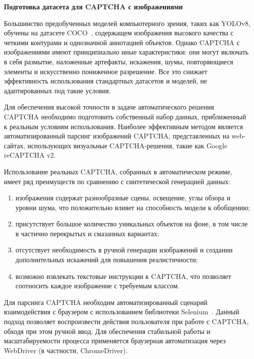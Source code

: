 \vspace{-0.7cm}

\textbf{Подготовка датасета для CAPTCHA с изображениями}

Большинство предобученных моделей компьютерного зрения, таких как YOLOv8, обучены 
на датасете COCO~\cite{COCO}, содержащем изображения высокого качества с четкими 
контурами и однозначной аннотацией объектов. Однако CAPTCHA с изображениями имеют 
принципиально иные характеристики: они могут включать в себя размытие, наложенные 
артефакты, искажения, шумы, повторяющиеся элементы и искусственно пониженное 
разрешение. Все это снижает эффективность использования стандартных датасетов и 
моделей, не адаптированных под такие условия.

Для обеспечения высокой точности в задаче автоматического решения CAPTCHA 
необходимо подготовить собственный набор данных, приближенный к реальным условиям 
использования. Наиболее эффективным методом является автоматизированный парсинг 
изображений CAPTCHA, представленных на web-сайтах, использующих визуальные 
CAPTCHA-решения, такие как Google reCAPTCHA v2.

Использование реальных CAPTCHA, собранных в автоматическом режиме, имеет ряд 
преимуществ по сравнению с синтетической генерацией данных:

\begin{enumerate}
    \item изображения содержат разнообразные сцены, освещение, углы обзора и 
    уровни шума, что положительно влияет на способность модели к обобщению;
    \item присутствует большое количество уникальных объектов на фоне, в том 
    числе в частично перекрытых и смазанных вариантах;
    \item отсутствует необходимость в ручной генерации изображений и создании 
    дополнительных искажений для повышения реалистичности;
    \item возможно извлекать текстовые инструкции к CAPTCHA, что позволяет 
    соотносить каждое изображение с требуемым классом.
\end{enumerate}

Для парсинга CAPTCHA необходим автоматизированный сценарий взаимодействия с 
браузером с использованием библиотеки Selenium~\cite{Selenium}. Данный подход 
позволяет воспроизвести действия пользователя при работе с CAPTCHA, обходя при 
этом ручной ввод. Для обеспечения стабильной работы и масштабируемости процесса 
применяется браузерная автоматизация через WebDriver (в частности, ChromeDriver).

